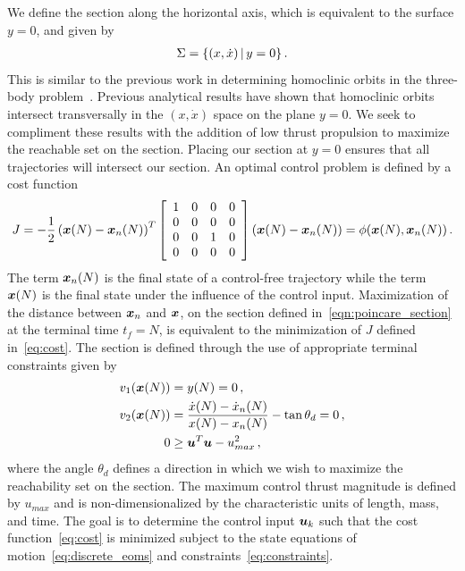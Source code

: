 \documentclass[smallcondensed]{svjour3}
\begin{document}
We define the \Poincare section along the horizontal axis, which is equivalent to the surface \( y = 0 \), and given by
\begin{align}
        \Sigma = \left\{  ( x, \dot{x}) \, | \, y = 0 \right\} . 
        \label{eqn:poincare_section}
\end{align}
This is similar to the previous work in determining homoclinic orbits in the three-body problem~\cite{llibre1985,koon2011}.
Previous analytical results have shown that homoclinic orbits intersect transversally in the \( (x, \dot{x} ) \) space on the plane \( y = 0 \).
We seek to compliment these results with the addition of low thrust propulsion to maximize the reachable set on the \Poincare section.
Placing our section at \( y = 0\) ensures that all trajectories will intersect our section.
An optimal control problem is defined by a  cost function
\begin{equation}
        J = -\frac{1}{2} \left( \bm{x}(N) - \bm{x}_{n}(N)\right)^T 
        \left[
        \begin{array}{cccc}
                1 & 0& 0& 0 \\
                 0& 0& 0& 0\\
                 0 & 0 & 1 &0\\
                 0 & 0& 0& 0
        \end{array}
        \right]
        \left( \bm{x}(N) - \bm{x}_{n}(N)\right) = \phi(\bm{x}(N),\bm{x}_n(N)) \, .
        \label{eq:cost}
\end{equation}
The term \( \bm{x}_n(N) \) is the final state of a control-free trajectory while the term \( \bm{x}(N)\) is the final state under the influence of the control input.
Maximization of the distance between \( \bm{x}_n \) and \(\bm{x} \), on the \Poincare section defined in~\cref{eqn:poincare_section} at the terminal time \( t_f = N \), is equivalent to the minimization of \( J \) defined in~\cref{eq:cost}.
The \Poincare section is defined through the use of appropriate terminal constraints given by
\begin{subequations}
\begin{align}
    v_1( \bm{x}(N) ) &= y(N) = 0 \, , \\ 
    v_2 ( \bm{x}(N) )&=  \frac{\dot{x}(N) - \dot{x}_n(N) }{x(N) -x_n(N) } - \tan{\theta_d} = 0\, , \\
         0 &\geq\bm{u}^T \bm{u} - u_{max}^2 \, ,
\end{align}
    \label{eq:constraints}
\end{subequations}
where the angle \( \theta_d\) defines a direction in which we wish to maximize the reachability set on the \Poincare section.
The maximum control thrust magnitude is defined by \( u_{max} \) and is non-dimensionalized by the characteristic units of length, mass, and time.
The goal is to determine the control input \( \bm{u}_k\) such that the cost function~\cref{eq:cost} is minimized subject to the state equations of motion~\cref{eq:discrete_eoms} and constraints~\cref{eq:constraints}.
\end{document}
